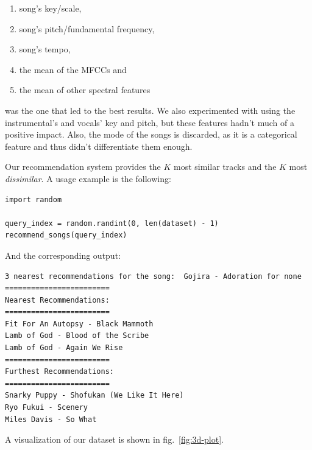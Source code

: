 \documentclass[
  letterpaper,
  twocolumn]{article}
\providecommand{\tightlist}{%
  \setlength{\itemsep}{0pt}\setlength{\parskip}{0pt}}
\begin{document}
\begin{enumerate}
\def\labelenumi{\arabic{enumi}.}
\tightlist
\item
  song's key/scale,
\item
  song's pitch/fundamental frequency,
\item
  song's tempo,
\item
  the mean of the MFCCs and
\item
  the mean of other spectral features
\end{enumerate}

was the one that led to the best results. We also experimented with
using the instrumental's and vocals' key and pitch, but these features
hadn't much of a positive impact. Also, the mode of the songs is
discarded, as it is a categorical feature and thus didn't differentiate
them enough.

Our recommendation system provides the \(K\) most similar tracks and the
\(K\) most \emph{dissimilar}. A usage example is the following:

\begin{verbatim}
import random

query_index = random.randint(0, len(dataset) - 1)
recommend_songs(query_index)
\end{verbatim}

And the corresponding output:

\begin{verbatim}
3 nearest recommendations for the song:  Gojira - Adoration for none
========================
Nearest Recommendations:
========================
Fit For An Autopsy - Black Mammoth
Lamb of God - Blood of the Scribe
Lamb of God - Again We Rise
========================
Furthest Recommendations:
========================
Snarky Puppy - Shofukan (We Like It Here)
Ryo Fukui - Scenery
Miles Davis - So What
\end{verbatim}

A visualization of our dataset is shown in fig.~\ref{fig:3d-plot}.
\end{document}
